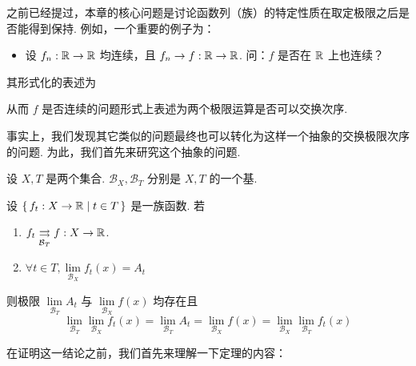 
之前已经提过，本章的核心问题是讨论函数列（族）的特定性质在取定极限之后是否能得到保持. 例如，一个重要的例子为：

\begin{itemize}
    \item 设 $f_n:\mathbb{R}\to\mathbb{R}$ 均连续，且 $f_n\to f:\mathbb{R}\to\mathbb{R}$. 问：$f$ 是否在 $\mathbb{R}$ 上也连续？
\end{itemize}

其形式化的表述为

\begin{center}
\end{center}

从而 $f$ 是否连续的问题形式上表述为两个极限运算是否可以交换次序.

事实上，我们发现其它类似的问题最终也可以转化为这样一个抽象的交换极限次序的问题. 为此，我们首先来研究这个抽象的问题.


\begin{theorem}\label{sl}
    设 $X,T$ 是两个集合. $\mathcal{B}_X,\mathcal{B}_T$ 分别是 $X,T$ 的一个基.

    设 $\set{f_t:X\to\mathbb{R}|t\in T}$ 是一族函数. 若

    \begin{enumerate}
        \item\label{slcon1} $f_t\underset{\mathcal{B}_T}{\rightrightarrows}f:X\to\mathbb{R}$.
        
        \item\label{slcon2} $\forall t\in T,\lim\limits_{\mathcal{B}_X}f_t(x)=A_t$
    \end{enumerate}

    则极限 $\lim\limits_{\mathcal{B}_T}A_t$ 与 $\lim\limits_{\mathcal{B}_X}f(x)$ 均存在且
$$
\lim_{\mathcal{B}_T}\lim_{\mathcal{B}_X}f_t(x)=\lim_{\mathcal{B}_T}A_t=\lim_{\mathcal{B}_X}f(x)=\lim_{\mathcal{B}_X}\lim_{\mathcal{B}_T}f_t(x)
$$
\end{theorem}

在证明这一结论之前，我们首先来理解一下定理的内容：


